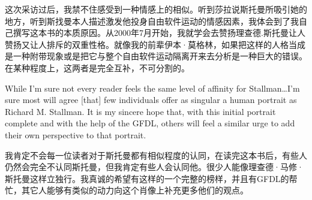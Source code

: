 \ifdefined\chs
这次采访过后，我禁不住感受到一种情感上的相似。听到莎拉说斯托曼所吸引她的地方，听到斯找曼本人描述激发他投身自由软件运动的情感因素，我体会到了我自己撰写这本书的本质原因。从2000年7月开始，我就学会去赞扬理查德.斯托曼让人赞扬又让人排斥的双重性格。就像我的前辈伊本·莫格林，如果把这样的人格当成是一种附带现象或是把它与整个自由软件运动隔离开来去分析是一种巨大的错误。在某种程度上，这两者是完全互补，不可分割的。
\fi

\ifdefined{}
\fi

\ifdefined{}
\fi

\ifdefined\eng
While I'm sure not every reader feels the same level of affinity for Stallman\ldots I'm sure most will agree [that] few individuals offer as singular a human portrait as Richard M. Stallman. It is my sincere hope that, with this initial portrait complete and with the help of the GFDL, others will feel a similar urge to add their own perspective to that portrait.
\fi

\ifdefined\chs
我肯定不会每一位读者对于斯托曼都有相似程度的认同，在读完这本书后，有些人仍然会完全不认同斯托曼，但我肯定有些人会认同他。很少人能像理查德·马修·斯托曼这样立独行。我真诚的希望有这样的一个完整的榜样，并且有GFDL的帮忙，其它人能够有类似的动力向这个肖像上补充更多他们的观点。
\fi

\theendnotes
\setcounter{endnote}{0}
